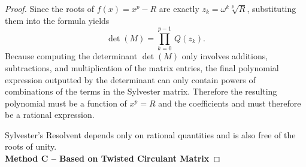 \begin{proof}
Since the roots of $f(x) = x^p - R$ are exactly $z_k = \omega^k \sqrt[p]{R}$, substituting them into the formula yields 
\[ \det(M) =  \prod_{k=0}^{p-1}\, Q(z_k) .\] 
Because computing the determinant $\det(M)$ only involves additions, subtractions, and multiplication of the matrix entries, the 
final polynomial expression outputted by the determinant can only contain powers of combinations of the terms in the Sylvester matrix. 
Therefore the resulting polynomial must be a function of $x^p = R$ and the coefficients and must therefore be a rational expression. 





Sylvester's Resolvent depends only on rational quantities and is also free of the roots of unity. \\

{\bf Method C -- Based on Twisted Circulant Matrix}


\end{proof}
